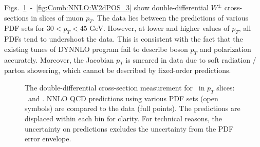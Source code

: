 Figs.~\ref{fig:Comb:NNLO:W2dNEG_1}~-~\ref{fig:Comb:NNLO:W2dPOS_3} show double-differential $W^{\pm}$ cross-sections in slices of muon $p_T$. The data lies between the predictions of various PDF sets for $30<p_T<45$ GeV. However, at lower and higher values of $p_T$, all PDFs tend to undershoot the data. This is consistent with the fact that the existing tunes of DYNNLO program fail to describe boson $p_T$ and polarization accurately. Moreover, the Jacobian $p_T$ is smeared in data due to soft radiation / parton showering, which cannot be described by fixed-order predictions.

\begin{figure}[phtb]
  \begin{center}
 \caption{ The double-differential cross-section measurement for \Wminusmunu\ in $p_T$ slices: \ptOne\ and \ptTwo. NNLO QCD predictions using various PDF sets (open symbols) are compared to the data (full points). The predictions are displaced within each bin for clarity. For technical reasons, the uncertainty on predictions excludes the uncertainty from the PDF error envelope. }
 \label{fig:Comb:NNLO:W2dNEG_1}
 \end{center}
\end{figure}

